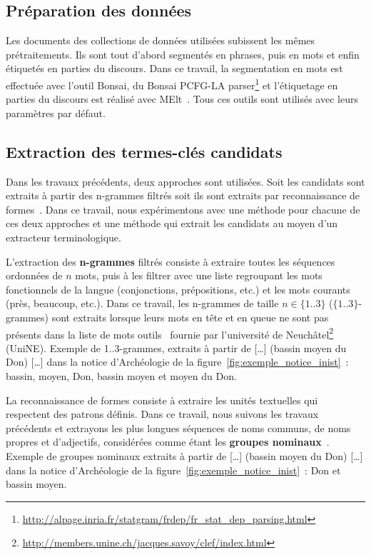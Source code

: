   \subsection{Préparation des données}
  \label{subsec:preparation_des_donnees}
    Les documents des collections de données utilisées subissent les mêmes
    prétraitements. Ils sont tout d'abord segmentés en phrases, puis en mots et
    enfin étiquetés en parties du discours. Dans ce travail, la segmentation en
    mots est effectuée avec l'outil Bonsai, du Bonsai PCFG-LA
    parser\footnote{\url{http://alpage.inria.fr/statgram/frdep/fr_stat_dep_parsing.html}}
    et l'étiquetage en parties du discours est réalisé avec
    MElt~\cite{denis2009melt}. Tous ces outils sont utilisés avec leurs
    paramètres par défaut.

  \subsection{Extraction des termes-clés candidats}
  \label{subsec:extraction_de_termes_cles_candidats}
    Dans les travaux précédents, deux approches sont utilisées. Soit les
    candidats sont extraits à partir des n-grammes filtrés soit ils sont
    extraits par reconnaissance de formes~\cite{hulth2003keywordextraction}.
    Dans ce travail, nous expérimentons avec une méthode pour chacune de ces
    deux approches et une méthode qui extrait les candidats au moyen d'un
    extracteur terminologique.

    L'extraction des \textbf{n-grammes} filtrés consiste à extraire toutes les
    séquences ordonnées de $n$ mots, puis à les filtrer avec une liste
    regroupant les mots fonctionnels de la langue (conjonctions, prépositions,
    etc.) et les mots courants (\og{}près\fg{}, \og{}beaucoup\fg{}, etc.). Dans
    ce travail, les n-grammes de taille $n \in \{1..3\}$ ($\{1..3\}$-grammes)
    sont extraits lorsque leurs mots en tête et en queue ne sont pas présents
    dans la liste de mots outils~\cite{witten1999kea} fournie par l'université
    de
    Neuchâtel\footnote{\url{http://members.unine.ch/jacques.savoy/clef/index.html}}
    (UniNE). Exemple de {1..3}-grammes, extraits à partir de \og{}[\dots]
    (bassin moyen du Don) [\dots]\fg{} dans la notice d'Archéologie de la
    figure~\ref{fig:exemple_notice_inist}~: \og{}bassin\fg{}, \og{}moyen\fg{},
    \og{}Don\fg{}, \og{}bassin moyen\fg{} et \og{}moyen du Don\fg{}.

    La reconnaissance de formes consiste à extraire les unités textuelles qui
    respectent des patrons définis. Dans ce travail, nous suivons les travaux
    précédents et extrayons les plus longues séquences de noms communs, de noms
    propres et d'adjectifs, considérées comme étant les \textbf{groupes
    nominaux}~\cite{hassan2010conundrums}. Exemple de groupes nominaux extraits
    à partir de \og{}[\dots] (bassin moyen du Don) [\dots]\fg{} dans la notice
    d'Archéologie de la figure~\ref{fig:exemple_notice_inist}~: \og{}Don\fg{} et
    \og{}bassin moyen\fg{}.

